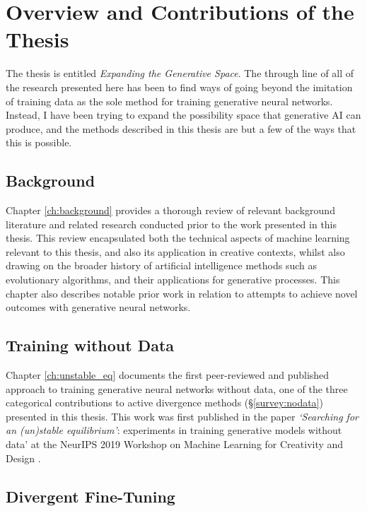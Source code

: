 \section{Overview and Contributions of the Thesis}

The thesis is entitled \textit{Expanding the Generative Space}. 
The through line of all of the research presented here has been to find ways of going beyond the imitation of training data as the sole method for training generative neural networks. 
Instead, I have been trying to expand the possibility space that generative AI can produce, and the methods described in this thesis are but a few of the ways that this is possible. 

\subsection{Background}

Chapter \ref{ch:background} provides a thorough review of relevant background literature and related research conducted prior to the work presented in this thesis.
This review encapsulated both the technical aspects of machine learning relevant to this thesis, and also its application in creative contexts, whilst also drawing on the broader history of artificial intelligence methods such as evolutionary algorithms, and their applications for generative processes. 
This chapter also describes notable prior work in relation to attempts to achieve novel outcomes with generative neural networks.

\subsection{Training without Data}

Chapter \ref{ch:unstable_eq} documents the first peer-reviewed and published approach to training generative neural networks without data, one of the three categorical contributions to active divergence methods (\S \ref{survey:nodata}) presented in this thesis.
This work was first published in the paper \textit{`Searching for an (un)stable equilibrium'}: experiments in training generative models without data' at the NeurIPS 2019 Workshop on Machine Learning for Creativity and Design \citep{broad2019searching}.

\subsection{Divergent Fine-Tuning}

